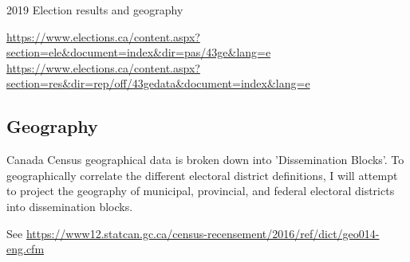 \documentclass{article}
\begin{document}
2019 Election results and geography

\url{https://www.elections.ca/content.aspx?section=ele&document=index&dir=pas/43ge&lang=e}
\url{https://www.elections.ca/content.aspx?section=res&dir=rep/off/43gedata&document=index&lang=e}

\subsection{Geography}

Canada Census geographical data is broken down into 'Dissemination Blocks'.  To geographically correlate the different electoral district definitions, I will attempt to project the geography of municipal, provincial, and federal electoral districts into dissemination blocks.

See \url{https://www12.statcan.gc.ca/census-recensement/2016/ref/dict/geo014-eng.cfm}


\medskip

\small
\end{document}

